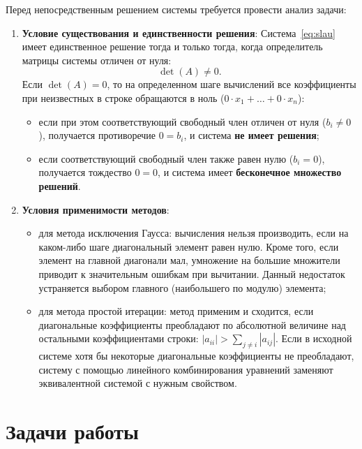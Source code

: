 Перед непосредственным решением системы требуется провести анализ задачи:
\begin{enumerate}
    \item \textbf{Условие существования и единственности решения}:
    Система~\eqref{eq:slau} имеет единственное решение тогда и только тогда, когда определитель матрицы системы отличен от нуля:
    \begin{equation}
        \det(A) \neq 0.
    \end{equation}
    Если $\det(A) = 0$, то на определенном шаге вычислений все коэффициенты при неизвестных в строке обращаются в ноль ($0 \cdot x_1 + \ldots + 0 \cdot x_n$):
    \begin{itemize}
        \item если при этом соответствующий свободный член отличен от нуля ($b_i \neq 0$), получается противоречие $0 = b_i$, и система \textbf{не имеет решения};
        \item если соответствующий свободный член также равен нулю ($b_i = 0$), получается тождество $0 = 0$, и система имеет \textbf{бесконечное множество решений}.
    \end{itemize}
    \item \textbf{Условия применимости методов}:
    \begin{itemize}
        \item для метода исключения Гаусса: вычисления нельзя производить, если на каком-либо шаге диагональный элемент равен нулю. Кроме того, если элемент на главной диагонали мал, умножение на большие множители приводит к значительным ошибкам при вычитании. Данный недостаток устраняется выбором главного (наибольшего по модулю) элемента;
        \item для метода простой итерации: метод применим и сходится, если диагональные коэффициенты преобладают по абсолютной величине над остальными коэффициентами строки: $|a_{ii}| > \sum_{j \neq i} |a_{ij}|$. Если в исходной системе хотя бы некоторые диагональные коэффициенты не преобладают, систему с помощью линейного комбинирования уравнений заменяют эквивалентной системой с нужным свойством.
    \end{itemize}
\end{enumerate}

\section{Задачи работы}

